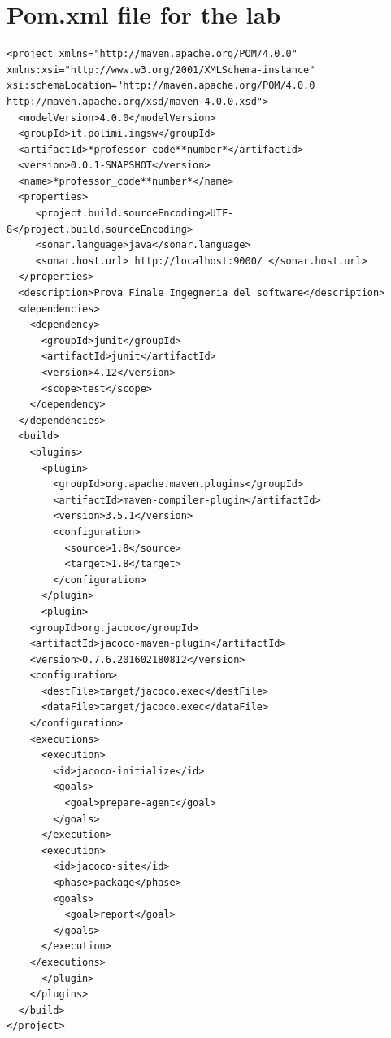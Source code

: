 \documentclass{article}
\begin{document}
\section{Pom.xml file for the lab}

\begin{lstlisting}
<project xmlns="http://maven.apache.org/POM/4.0.0" xmlns:xsi="http://www.w3.org/2001/XMLSchema-instance" xsi:schemaLocation="http://maven.apache.org/POM/4.0.0 http://maven.apache.org/xsd/maven-4.0.0.xsd">
  <modelVersion>4.0.0</modelVersion>
  <groupId>it.polimi.ingsw</groupId> 
  <artifactId>*professor_code**number*</artifactId> 
  <version>0.0.1-SNAPSHOT</version>
  <name>*professor_code**number*</name>
  <properties>
     <project.build.sourceEncoding>UTF-8</project.build.sourceEncoding>
     <sonar.language>java</sonar.language>
     <sonar.host.url> http://localhost:9000/ </sonar.host.url>
  </properties>
  <description>Prova Finale Ingegneria del software</description>
  <dependencies>
    <dependency>
      <groupId>junit</groupId>
      <artifactId>junit</artifactId>
      <version>4.12</version>
      <scope>test</scope>
    </dependency>
  </dependencies>
  <build>
    <plugins>
      <plugin>
        <groupId>org.apache.maven.plugins</groupId>
        <artifactId>maven-compiler-plugin</artifactId>
        <version>3.5.1</version>
        <configuration>
          <source>1.8</source>
          <target>1.8</target>
        </configuration>
      </plugin>
      <plugin>
	<groupId>org.jacoco</groupId>
	<artifactId>jacoco-maven-plugin</artifactId>
	<version>0.7.6.201602180812</version>
	<configuration>
	  <destFile>target/jacoco.exec</destFile>
	  <dataFile>target/jacoco.exec</dataFile>
	</configuration>
	<executions>
	  <execution>
	    <id>jacoco-initialize</id>
	    <goals>
	      <goal>prepare-agent</goal>
	    </goals>
	  </execution>
	  <execution>
	    <id>jacoco-site</id>
	    <phase>package</phase>
	    <goals>
	      <goal>report</goal>
	    </goals>
	  </execution>
	</executions>
      </plugin>
    </plugins>
  </build>
</project>
\end{lstlisting}

\fi
\end{document}

